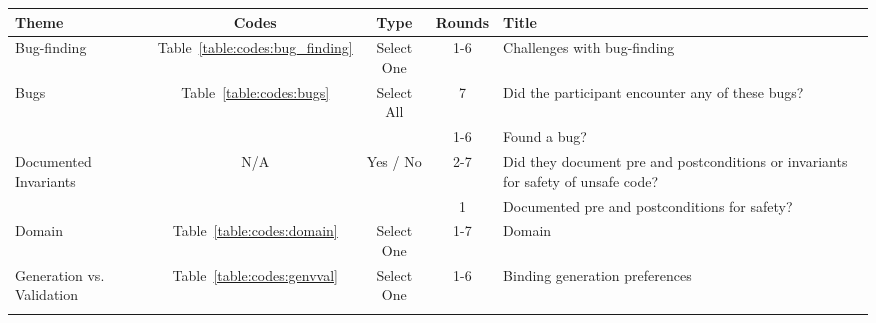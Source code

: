 \begin{tabular}{|l|c|c|c|p{5cm}|}
\hline
\textbf{Theme}                             & \textbf{Codes}                      & \textbf{Type}                   & \textbf{Rounds} & \textbf{Title}                                                                                                             \\ \hline
Bug-finding                                & Table~\ref{table:codes:bug_finding} & Select One                      & 1-6             & Challenges with bug-finding                                                                                                \\ \hline\hline
\multirow{2}{*}{Bugs}                      & Table~\ref{table:codes:bugs}              & Select All                      & 7               & Did the participant encounter any of these bugs?                                                                           \\ \cline{4-5} 
                                           &                                     &                                 & 1-6             & Found a bug?                                                                                                               \\ \hline\hline
\multirow{2}{*}{Documented Invariants}     & N/A                                 & Yes / No                        & 2-7             & Did they document pre and postconditions or invariants for safety of unsafe code?                                          \\ \cline{4-5} 
                                           &                                     &                                 & 1               & Documented pre and postconditions for safety?                                                                              \\ \hline\hline
Domain                                     & Table~\ref{table:codes:domain}      & Select One                      & 1-7             & Domain                                                                                                                     \\ \hline\hline
\multirow{2}{*}{Generation vs. Validation} & Table~\ref{table:codes:genvval}           & Select One                      & 1-6             & Binding generation preferences                                                                                             \\ \cline{4-5} 

\end{tabular}
